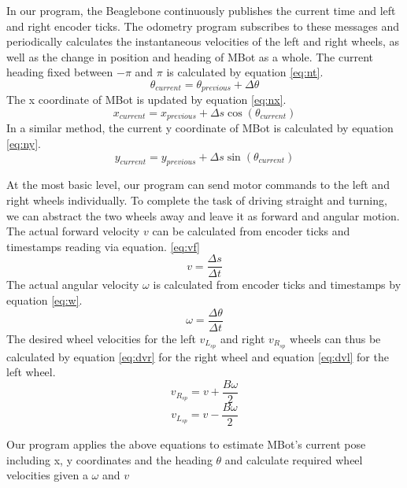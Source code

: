 \documentclass[conference]{IEEEtran}
\begin{document}
In our program, the Beaglebone continuously publishes the current time and left and right encoder ticks. The odometry program subscribes to these messages and periodically calculates the instantaneous velocities of the left and right wheels, as well as the change in position and heading of MBot as a whole. The current heading fixed between $-\pi$ and $\pi$ is calculated by equation \ref{eq:nt}.
\begin{equation} \label{eq:nt}
\theta_{current} = \theta_{previous} + \Delta \theta
\end{equation}
The x coordinate of MBot is updated by equation \ref{eq:nx}.
\begin{equation} \label{eq:nx}
x_{current} = x_{previous} + \Delta s \cos(\theta_{current})
\end{equation}
In a similar method, the current y coordinate of MBot is calculated by equation \ref{eq:ny}.
\begin{equation} \label{eq:ny}
y_{current} = y_{previous} + \Delta s \sin(\theta_{current})
\end{equation}

At the most basic level, our program can send motor commands to the left and right wheels individually. To complete the task of driving straight and turning, we can abstract the two wheels away and leave it as forward and angular motion. The actual forward velocity $v$ can be calculated from encoder ticks and timestamps reading via equation. \ref{eq:vf}
\begin{equation} \label{eq:vf}
v = \frac{\Delta s}{\Delta t}
\end{equation}
The actual angular velocity $\omega$ is calculated from encoder ticks and timestamps by equation \ref{eq:w}.
\begin{equation} \label{eq:w}
\omega = \frac{\Delta \theta}{\Delta t}
\end{equation}
The desired wheel velocities for the left $v_{L_{sp}}$ and right $v_{R_{sp}}$ wheels can thus be calculated by equation \ref{eq:dvr} for the right wheel and equation \ref{eq:dvl} for the left wheel.
\begin{equation} \label{eq:dvr}
v_{R_{sp}} = v + \frac{B\omega}{2}
\end{equation}
\begin{equation} \label{eq:dvl}
v_{L_{sp}} = v - \frac{B\omega}{2}
\end{equation}

Our program applies the above equations to estimate MBot's current pose including x, y coordinates and the heading $\theta$ and calculate required wheel velocities given a $\omega$ and $v$
\end{document}
